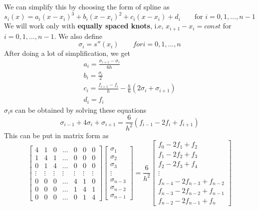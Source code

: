 \documentclass{article}
\begin{document}
	We can simplify this by choosing the form of spline as
	\[s_i(x) = a_i(x-x_i)^3 + b_i(x-x_i)^2 + c_i(x-x_i) +d_i \qquad \text{for }i=0,1,\hdots,n-1\]
	We will work only with \textbf{equally spaced knots}, i.e, $x_{i+1}-x_{i} = const$ for $i = 0, 1,\hdots,n-1$.
	We also define 
	\[\sigma_i = s''(x_i) \qquad for i=0,1,\hdots,n\]
	After doing a lot of simplification, we get 
	\begin{gather*}
		\boxed{a_i = \frac{\sigma_{i+1}-\sigma_i}{6h}}\\
		\boxed{b_i = \frac{\sigma_i}{2}}\\
		\boxed{c_i = \frac{f_{i+1}-f_i}{h} - \frac{h}{6}(2\sigma_i+\sigma_{i+1})}\\
		\boxed{d_i = f_i}
	\end{gather*}
	$\sigma_i$s can be obtained by solving these equations
	\[\boxed{\sigma_{i-1} + 4 \sigma_i + \sigma_{i+1} = \frac{6}{h^2}(f_{i-1} - 2f_i + f_{i+1} )}\]
	This can be put in matrix form as
	\begin{equation*}
	\begin{bmatrix}
	4 &1 &0 &\hdots &0 &0 &0\\
	1 &4 &1 &\hdots &0 &0 &0\\
	0 &1 &4 &\hdots &0 &0 &0\\
	\vdots &\vdots &\vdots &\vdots &\vdots &\vdots &\vdots\\
	0 &0 &0 &\hdots &4 &1 &0\\
	0 &0 &0 &\hdots &1 &4 &1\\
	0 &0 &0 &\hdots &0 &1 &4
	\end{bmatrix} 
	\begin{bmatrix}
	\sigma_1\\
	\sigma_2\\
	\sigma_3\\
	\vdots\\
	\sigma_{n-3}\\
	\sigma_{n-2}\\
	\sigma_{n-1}
	\end{bmatrix}
	= \frac{6}{h^2}
	\begin{bmatrix}
	f_0 - 2f_1 +f_2\\
	f_1 -2f_2 +f_3\\
	f_2 -2f_3 +f_4\\
	\vdots\\
	f_{n-4} -2f_{n-3} +f_{n-2}\\
	f_{n-3} -2f_{n-2} +f_{n-1}\\
	f_{n-2} -2f_{n-1} +f_{n}
	\end{bmatrix}
	\end{equation*}
\end{document}
